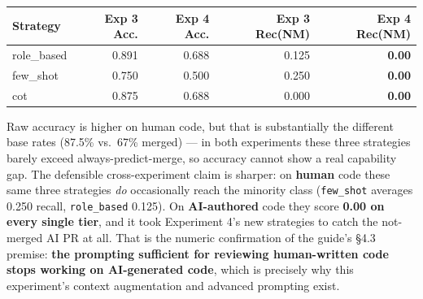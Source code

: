 \documentclass{experimentreport}
\begin{document}
{\begin{center}
\begin{tabular}{|l|r|r|r|r|}
\hline
\textbf{Strategy} & \textbf{Exp 3 Acc.} & \textbf{Exp 4 Acc.} & \textbf{Exp 3 Rec(NM)} & \textbf{Exp 4 Rec(NM)} \\
\hline
role\_based & 0.891 & 0.688 & 0.125 & \textbf{0.00} \\
few\_shot   & 0.750 & 0.500 & 0.250 & \textbf{0.00} \\
cot         & 0.875 & 0.688 & 0.000 & \textbf{0.00} \\
\hline
\end{tabular}
\end{center}
\noindent Raw accuracy is higher on human code, but that is substantially the different base rates
(87.5\% vs.\ 67\% merged) --- in both experiments these three strategies barely exceed
always-predict-merge, so accuracy cannot show a real capability gap. The defensible cross-experiment
claim is sharper: on \textbf{human} code these same three strategies \emph{do} occasionally reach the
minority class (\texttt{few\_shot} averages 0.250 recall, \texttt{role\_based} 0.125). On
\textbf{AI-authored} code they score \textbf{0.00 on every single tier}, and it took Experiment 4's
new strategies to catch the not-merged AI PR at all. That is the numeric confirmation of the guide's
\S4.3 premise: \textbf{the prompting sufficient for reviewing human-written code stops working on
AI-generated code}, which is precisely why this experiment's context augmentation and advanced
prompting exist.

}

\end{document}
